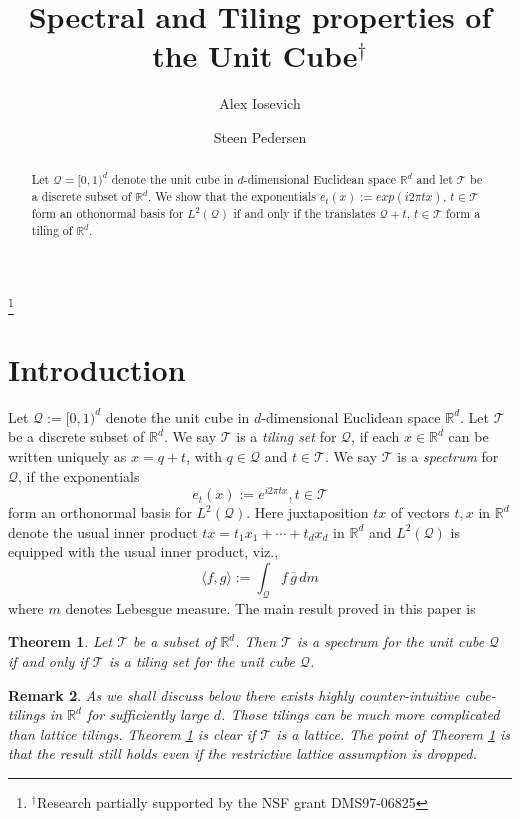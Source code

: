 \documentclass[12pt]{amsart}
\theoremstyle{plain}
\newtheorem{theorem}{Theorem}[section]
\newtheorem{remark}[theorem]{Remark}
\numberwithin{equation}{section}
\newcommand{\Q}{\ensuremath{\mathcal{Q}}\xspace}
\newcommand{\T}{\ensuremath{\mathcal{T}}\xspace}
\newcommand{\Rd}{\ensuremath{\mathbb{R}^{d}}\xspace}
\begin{document}
\title[The Unit Cube]
   {Spectral and Tiling properties of the Unit Cube$^{\dagger}$}

\author{Alex Iosevich}\author{Steen Pedersen}
\address{Department of Mathematics, Wright State University,
   Dayton OH 45435, USA}
\thanks{$^{\dagger}$Research partially
supported by the NSF grant DMS97-06825}
 

\begin{abstract}
Let $\Q=[0,1)^d$ denote the unit cube in $d$-dimensional Euclidean
space \Rd and let \T be a discrete subset of \Rd.
We show that the exponentials $e_t(x):=exp(i2\pi tx)$, $t\in\T$ form
an othonormal basis for $L^2(\Q)$ if and only if the translates
$\Q+t$, $t\in\T$ form a tiling of \Rd.
\end{abstract}

\maketitle


\section{Introduction}
Let $\Q:=[0,1)^d$ denote the unit cube in $d$-dimensional Euclidean
space \Rd.
Let \T be a discrete subset of \Rd.
We say \T is a \emph{tiling set} for \Q, if each $x\in\Rd$ can be
written uniquely as $x=q+t$, with $q\in\Q$ and $t\in \T$.
We say \T is a \emph{spectrum} for \Q, if the exponentials
\[
   e_t(x):=e^{i2\pi tx}, t\in \T
\]
form an orthonormal basis for $L^2(\Q)$. Here juxtaposition $tx$ of
vectors $t,x$ in \Rd denote the usual inner product
$tx=t_1x_1+\cdots+t_dx_d$ in \Rd and $L^2(\Q)$ is equipped with the
usual inner product, viz.,
\begin{equation*}
   \langle f, g \rangle := \int_{\Q}f\,\overline{g}\,dm
\end{equation*}
where $m$ denotes Lebesgue measure.
The main result proved in this paper is
\begin{theorem}\label{T:main}
   Let \T be a subset of \Rd. Then \T is a spectrum for the unit cube
   \Q if and only if \T is a tiling set for the unit cube \Q.
\end{theorem}

\begin{remark}
As we shall discuss below there exists highly counter-intuitive
cube-tilings in $\mathbb{R}^d$ for sufficiently large $d$.
Those tilings can be much more complicated than lattice tilings.
Theorem \ref{T:main} is clear if \T is a lattice. The point of Theorem
\ref{T:main} is that the result still holds even if the restrictive
lattice assumption is dropped.
\end{remark}
\end{document}
